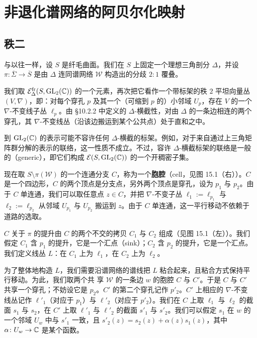 \section{非退化谱网络的阿贝尔化映射}

\subsection{秩二}

与以往一样，设 $S$ 是纤毛曲面。我们在 $S$ 上固定一个理想三角剖分 $\Delta$，并设 $\pi\colon\overline{\Sigma}\to\overline{S}$ 是由 $\Delta$ 连同谱网络 $\mathcal{W}$ 构造出的分歧 $2:1$ 覆叠。

我们取 $\mathcal{E}^{\mathrm{fr}}_\Delta(S,\operatorname{GL}_2(\mathbb{C}))$ 的一个元素，再次把它看作一个带标架的秩 $2$ 平坦向量丛 $(V,\nabla)$，即：对每个穿孔 $p$ 及其一个（可缩到 $p$ 的）小邻域 $U_p$，存在 $V$ 的一个 $\nabla$-不变线子丛 $\ell_p$。由 §10.2.2 中定义的 $\Delta$-横截性，对由 $\Delta$ 的一条边相连的两个穿孔，其 $\nabla$-不变线丛（沿该边搬运到某个公共点）处于直和之中。

\begin{remark}[15.1]
到 $\operatorname{GL}_2(\mathbb{C})$ 的表示可能不容许任何 $\Delta$-横截的标架。例如，对于来自通过上三角矩阵群分解的表示的联络，这一性质不成立。不过，容许 $\Delta$-横截标架的联络是一般的（generic），即它们构成 $\mathcal{E}(S,\operatorname{GL}_2(\mathbb{C}))$ 的一个开稠密子集。
\end{remark}

现在取 $S\setminus\pi(\mathcal{W})$ 的一个连通分支 $C$，称为一个\textbf{胞腔}（cell，见图 15.1（右））。$C$ 是一个四边形，$C$ 的两个顶点是分支点，另外两个顶点是穿孔，设为 $p_1$ 与 $p_2$。由于 $C$ 单连通，我们可以取任意点 $z\in C$，并把 $\nabla$-不变子丛 $\ell_1:=\ell_{p_1}$ 与 $\ell_2:=\ell_{p_2}$ 从邻域 $U_{p_1}$ 与 $U_{p_2}$ 搬运到 $z$。由于 $C$ 单连通，这一平行移动不依赖于道路的选取。


$C$ 关于 $\pi$ 的提升由 $C$ 的两个不交的拷贝 $C_1$ 与 $C_2$ 组成（见图 15.1（左））。我们假定 $C_1$ 含 $p_1$ 的提升，它是一个汇点（sink）；$C_2$ 含 $p_2$ 的提升，它是一个汇点。我们定义线丛 $L$：在 $C_1$ 上为 $\ell_1$，在 $C_2$ 上为 $\ell_2$。

为了整体地构造 $L$，我们需要沿谱网络的谱线把 $L$ 粘合起来，且粘合方式保持平行移动。为此，我们取两个共%
享 $\mathcal{W}$ 的一条边 $w$ 的胞腔 $C$ 与 $C'$。于是 $C$ 与 $C'$ 共享一个穿孔；不妨设它是 $p_2$。$C'$ 的第二个穿孔记作 $p'_2$。$C'$ 上相应的 $\nabla$-不变线丛记作 $\ell'_1$（对应于 $p_1$）与 $\ell'_2$（对应于 $p'_2$）。我们在 $C$ 上取 $\ell_1$ 与 $\ell_2$ 的截面 $s_1$ 与 $s_2$，在 $C'$ 上取 $\ell'_1$ 与 $\ell'_2$ 的截面 $s'_1$ 与 $s'_2$。我们可以假定 $s_1$ 在 $w$ 的一个邻域 $U_w$ 中与 $s'_1$ 一致，且 $s'_2(z)=s_2(z)+\alpha(z)s_1(z)$，其中 $\alpha\colon U_w\to\mathbb{C}$ 是某个函数。


